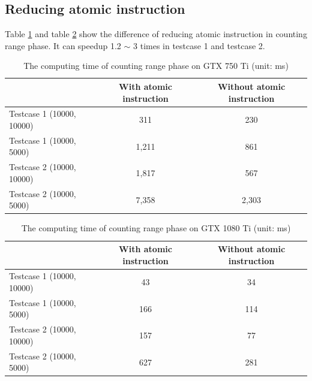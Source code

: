 \subsection{Reducing atomic instruction}
Table \ref{table:5_11} and table \ref{table:5_12} show the difference of reducing atomic instruction in counting range phase. It can speedup 1.2 $\sim$ 3 times in testcase 1 and testcase 2.
\begin{table}[!h]
\centering
\begin{tabular}{| l | c | c |} 
 \hline
  & With atomic instruction & Without atomic instruction \\ [0.5ex] \hline
  Testcase 1 (10000, 10000) & 311 & 230\\ \hline
  Testcase 1 (10000, 5000) & 1,211 & 861\\ \hline
  Testcase 2 (10000, 10000) & 1,817 & 567\\ \hline
  Testcase 2 (10000, 5000) & 7,358 & 2,303\\ \hline
\end{tabular}
\caption{The computing time of counting range phase on GTX 750 Ti (unit: ms)}
\label{table:5_11}
\end{table}

\begin{table}[!h]
\centering
\begin{tabular}{| l | c | c |} 
 \hline
  & With atomic instruction & Without atomic instruction \\ [0.5ex] \hline
  Testcase 1 (10000, 10000) & 43 & 34\\ \hline
  Testcase 1 (10000, 5000) & 166 & 114\\ \hline
  Testcase 2 (10000, 10000) & 157 & 77\\ \hline
  Testcase 2 (10000, 5000) & 627 & 281\\ \hline
\end{tabular}
\caption{The computing time of counting range phase on GTX 1080 Ti (unit: ms)}
\label{table:5_12}
\end{table}

